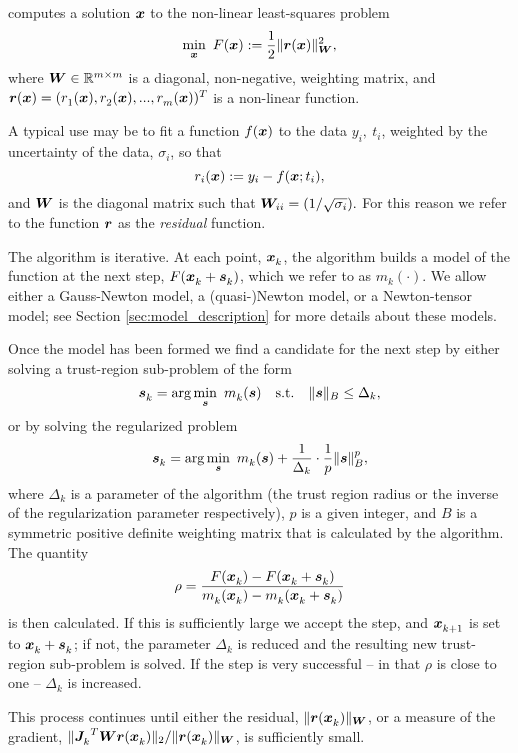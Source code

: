 {\tt \fullpackagename} computes a solution $\vx$ to the non-linear least-squares problem
\begin{equation}
\min_\vx \  F(\vx) := \frac{1}{2}\| \vr(\vx) \|_{\vW}^2,
\label{eq:nlls_problem}
\end{equation}
where $\vW\in\mathbb{R}^{m\times m}$ is a diagonal, non-negative, weighting matrix, and $\vr(\vx) =(\comp[1]{r}(\vx), \comp[2]{r}(\vx),...,\comp[m]{r}(\vx))^T$ is a non-linear function.

A typical use may be to fit a function $f(\vx)$ to the data $y_i, \ t_i$, weighted by the uncertainty of the data, $\sigma_i$, so that
$$r_i(\vx) := y_i - f(\vx;t_i),$$
and $\vW$ is the diagonal matrix such that $\vW_{ii} = (1/\sqrt{\sigma_i}).$  For this reason 
we refer to the function $\vr$ as the \emph{residual} function.

The algorithm is iterative.
At each point, $\iter{\vx}$, the algorithm builds a model of the function at the next step, $F({\iter{\vx}+\iter{\vs}})$, which we refer to as $m_k(\cdot)$.  We allow either a Gauss-Newton model, a (quasi-)Newton model, or a Newton-tensor model; see Section \ref{sec:model_description} for more details about these models.  

Once the model has been formed we find a candidate for the next step by either solving a trust-region sub-problem of the form
\begin{equation}
\iter{\vs} = \arg \min_{\vs} \ \iter{m} (\vs) \quad \mathrm{s.t.} \quad  \|\vs\|_B \leq \Delta_k,\label{eq:tr_subproblem}
\end{equation}
or by solving the regularized problem 
\begin{equation}
\iter{\vs} = \arg \min_{\vs} \ \iter{m} (\vs)  + \frac{1}{\Delta_k}\cdot \frac{1}{p} \|\vs\|_B^p,\label{eq:reg_subproblem}
\end{equation}
where $\Delta_k$ is a parameter of the algorithm (the trust region radius or the inverse of the regularization parameter respectively), $p$ is a given integer, and $B$ is a symmetric positive definite weighting matrix that is calculated by the algorithm.
The quantity
\[\rho = \frac{F(\iter{\vx}) - F(\iter{\vx} + \iter{\vs})}{\iter{m}(\iter{\vx}) - \iter{m}(\iter{\vx} + \iter{\vs})}\]
is then calculated.
If this is sufficiently large we accept the step, and $\iter[k+1]{\vx}$ is set to $\iter{\vx} + \iter{\vs}$; if not, the parameter $\Delta_k$
is reduced and  the resulting new trust-region sub-problem is solved.  If the step is very successful -- in that $\rho$ is close to one --
$\Delta_k$ is increased.

This process continues until either the residual, $\|\vr(\iter{\vx})\|_\vW$, or a measure of the gradient,
$\|{\iter{\vJ}}^T\vW\vr(\iter{\vx})\|_2 / \|\vr(\iter{\vx})\|_\vW$, is sufficiently small.


